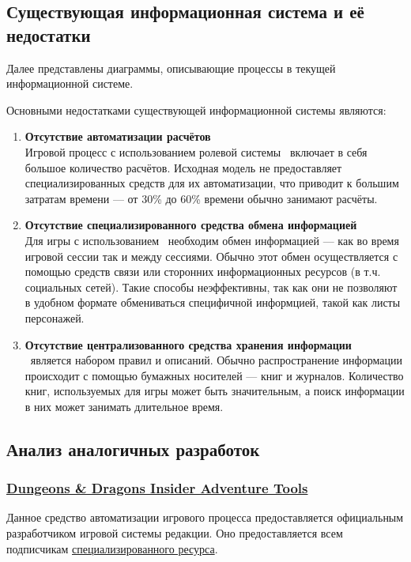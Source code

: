 \subsection{Существующая информационная система и её недостатки}

Далее представлены диаграммы, описывающие процессы в текущей информационной системе.



Основными недостатками существующей информационной системы являются:
\begin{enumerate}
\item \textbf{Отсутствие автоматизации расчётов}\\
Игровой процесс с использованием ролевой системы \dnd\ включает в себя большое количество расчётов. Исходная модель не предоставляет специализированных средств для их автоматизации, что приводит к большим затратам времени --- от 30\% до 60\% времени обычно занимают расчёты.
\item \textbf{Отсутствие специализированного средства обмена информацией}\\
Для игры с использованием \dnd\ необходим обмен информацией --- как во время игровой сессии так и между сессиями. Обычно этот обмен осуществляется с помощью средств связи или сторонних информационных ресурсов (в т.ч. социальных сетей). Такие способы неэффективны, так как они не позволяют в удобном формате обмениваться специфичной информцией, такой как листы персонажей.
\item \textbf{Отсутствие централизованного средства хранения информации}\\
\dnd\ является набором правил и описаний. Обычно распространение информации происходит с помощью бумажных носителей --- книг и журналов. Количество книг, используемых для игры может быть значительным, а поиск информации в них может занимать длительное время.
\end{enumerate}


\subsection{Анализ аналогичных разработок}
\subsubsection{\href{http://www.wizards.com/dnd/Tool.aspx?x=dnd/4new/tool/adventuretools}{Dungeons \& Dragons Insider Adventure Tools}}
Данное средство автоматизации игрового процесса предоставляется официальным разработчиком игровой системы  редакции. Оно предоставляется всем подписчикам \href{http://www.wizards.com/dnd}{специализированного ресурса}.

